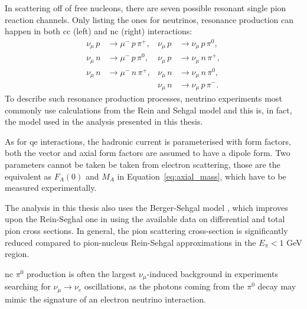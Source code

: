 In scattering off of free nucleons, there are seven possible resonant single pion reaction channels. Only listing the ones for neutrinos, resonance production can happen in both \acrshort{cc} (left) and \acrshort{nc}  (right) interactions:
\begin{align*}
\nu_\mu \, p & \rightarrow \mu^- \, p \, \pi^+,   &  \nu_\mu \, p & \rightarrow \nu_\mu \, p \, \pi^0, \\
\nu_\mu \, n & \rightarrow \mu^- \, p \, \pi^0,   &  \nu_\mu \, p & \rightarrow \nu_\mu \, n \, \pi^+, \\
\nu_\mu \, n & \rightarrow \mu^- \, n \, \pi^+,   &  \nu_\mu \, n & \rightarrow \nu_\mu \, n \, \pi^0, \\
 &                                               &  \nu_\mu \, n & \rightarrow \nu_\mu \, p \, \pi^-.
\end{align*}
To describe such resonance production processes, neutrino experiments most commonly use calculations from the Rein and Sehgal model \cite{rein_sehgal, fkr} and this is, in fact, the model used in the analysis presented in this thesis.

As for \acrshort{qe} interactions, the hadronic current is parameterised with form factors, both the vector and axial form factors are assumed to have a dipole form. Two parameters cannot be taken be taken from electron scattering, those are the equivalent as $F_A(0)$ and $M_A$ in Equation~\eqref{eq:axial_mass}, which have to be measured experimentally.

The analysis in this thesis also uses the Berger-Sehgal model \cite{berger_sehgal}, which improves upon the Rein-Seghal one in  using the available data on differential and total pion cross sections. In general, the pion scattering cross-section is significantly reduced compared to pion-nucleus Rein-Sehgal approximations in the $E_\pi < 1$ GeV region. 

\acrshort{nc} $\pi^0$ production is often the largest $\nu_\mu$-induced background in experiments searching for $\nu_\mu \rightarrow \nu_e$ oscillations, as the photons coming from the $\pi^0$ decay may mimic the signature of an electron neutrino interaction.





